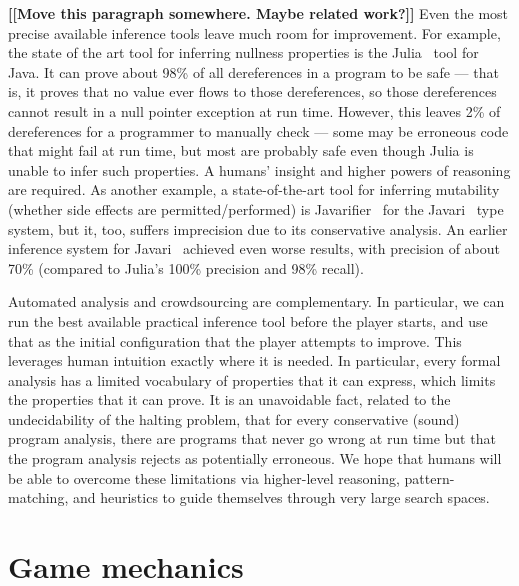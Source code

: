 \documentclass[preprint]{sig-alternate}
\def\<#1>{\codeid{#1}}
\newcommand{\codeid}[1]{\ifmmode{\mbox{\ttfamily{#1}}}\else{\ttfamily #1}\fi}
\newcommand{\todo}[1]{{\color{red}\bfseries [[#1]]}}
\begin{document}
\todo{Move this paragraph somewhere. Maybe related work?}
Even the most precise available inference tools leave much room for
improvement.  For example, the state of the art tool for inferring
nullness properties is the
Julia~\cite{julia-web-interface,Spoto2008,Spoto10:LPAR,Spoto10,SpotoE2011}
tool for Java.  It can prove about 98\% of all dereferences in a
program to be safe --- that is, it proves that no \<null> value ever
flows to those dereferences, so those dereferences cannot result in a
null pointer exception at run time.  However, this leaves 2\% of
dereferences for a programmer to manually check --- some may be
erroneous code that might fail at run time, but most are probably safe
even though Julia is unable to infer such properties.  A humans'
insight and higher powers of reasoning are required.  As another
example, a state-of-the-art tool for inferring mutability (whether
side effects are permitted/performed) is
Javarifier~\cite{Quinonez2008,QuinonezTE2008} for the
Javari~\cite{BirkaE2004,TschantzE2005,Tschantz2006} type system, but
it, too, suffers imprecision due to its conservative analysis.  An
earlier inference system for
Javari~\cite{GreenfieldboyceF2005,GreenfieldboyceF2007} achieved even
worse results, with precision of about 70\% (compared to Julia's 100\%
precision and 98\% recall).


Automated analysis and crowdsourcing are complementary.  In
particular, we can run the best available practical inference tool
before the player starts, and use that as the initial configuration
that the player attempts to improve.  This leverages human intuition
exactly where it is needed.  In particular, every formal analysis has
a limited vocabulary of properties that it can express, which limits
the properties that it can prove.  It is an unavoidable fact, related
to the undecidability of the halting problem, that for every
conservative (sound) program analysis, there are programs that never
go wrong at run time but that the program analysis rejects as
potentially erroneous.  We hope that humans will be able to overcome
these limitations via higher-level reasoning, pattern-matching, and
heuristics to guide themselves through very large search spaces.




\section{Game mechanics}
\label{sec:game}
\end{document}
